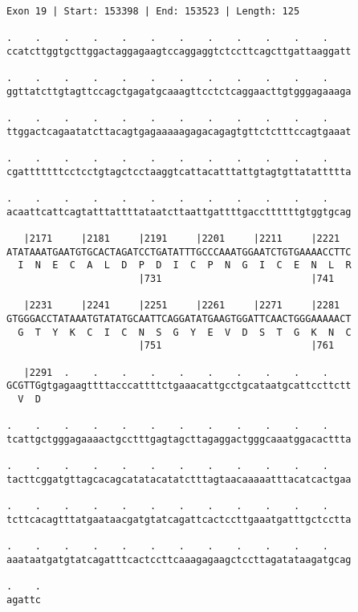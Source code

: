 \documentclass{article}
\begin{document}
\begin{Verbatim}
Exon 19 | Start: 153398 | End: 153523 | Length: 125
 
.    .    .    .    .    .    .    .    .    .    .    .    
ccatcttggtgcttggactaggagaagtccaggaggtctccttcagcttgattaaggatt
  
.    .    .    .    .    .    .    .    .    .    .    .    
ggttatcttgtagttccagctgagatgcaaagttcctctcaggaacttgtgggagaaaga
  
.    .    .    .    .    .    .    .    .    .    .    .    
ttggactcagaatatcttacagtgagaaaaagagacagagtgttctctttccagtgaaat
  
.    .    .    .    .    .    .    .    .    .    .    .    
cgatttttttcctcctgtagctcctaaggtcattacatttattgtagtgttatattttta
  
.    .    .    .    .    .    .    .    .    .    .    .    
acaattcattcagtatttattttataatcttaattgattttgaccttttttgtggtgcag
  
   |2171     |2181     |2191     |2201     |2211     |2221  
ATATAAATGAATGTGCACTAGATCCTGATATTTGCCCAAATGGAATCTGTGAAAACCTTC
  I  N  E  C  A  L  D  P  D  I  C  P  N  G  I  C  E  N  L  R
                       |731                          |741   
  
   |2231     |2241     |2251     |2261     |2271     |2281  
GTGGGACCTATAAATGTATATGCAATTCAGGATATGAAGTGGATTCAACTGGGAAAAACT
  G  T  Y  K  C  I  C  N  S  G  Y  E  V  D  S  T  G  K  N  C
                       |751                          |761   
  
   |2291  .    .    .    .    .    .    .    .    .    .    
GCGTTGgtgagaagttttacccattttctgaaacattgcctgcataatgcattccttctt
  V  D                                                      
  
.    .    .    .    .    .    .    .    .    .    .    .    
tcattgctgggagaaaactgcctttgagtagcttagaggactgggcaaatggacacttta
  
.    .    .    .    .    .    .    .    .    .    .    .    
tacttcggatgttagcacagcatatacatatctttagtaacaaaaatttacatcactgaa
  
.    .    .    .    .    .    .    .    .    .    .    .    
tcttcacagtttatgaataacgatgtatcagattcactccttgaaatgatttgctcctta
  
.    .    .    .    .    .    .    .    .    .    .    .    
aaataatgatgtatcagatttcactccttcaaagagaagctccttagatataagatgcag
  
.    .
agattc
\end{Verbatim}
\newpage
\end{document}
